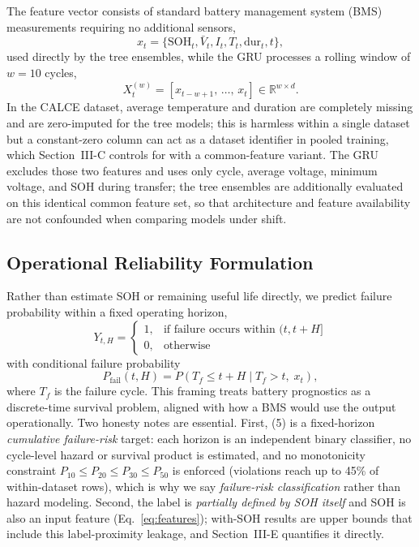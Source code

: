 \documentclass[conference]{IEEEtran}
\begin{document}
The feature vector consists of standard battery management system (BMS)
measurements requiring no additional sensors,
\begin{equation}
x_t = \{\mathrm{SOH}_t, \bar{V}_t, I_t, T_t, \mathrm{dur}_t, t\},
\label{eq:features}
\end{equation}
used directly by the tree ensembles, while the GRU processes a rolling
window of $w=10$ cycles,
\begin{equation}
X_t^{(w)} = \left[x_{t-w+1},\, \ldots,\, x_t\right] \in \mathbb{R}^{w \times d}.
\label{eq:window}
\end{equation} In the CALCE dataset, average temperature and
duration are completely missing and are zero-imputed for the tree
models; this is harmless within a single dataset but a constant-zero
column can act as a dataset identifier in pooled training, which
Section~III-C controls for with a common-feature variant. The GRU
excludes those two features and uses only cycle, average voltage,
minimum voltage, and SOH during transfer; the tree ensembles are
additionally evaluated on this identical common feature set, so that
architecture and feature availability are not confounded when
comparing models under shift.

\subsection{Operational Reliability Formulation}
Rather than estimate SOH or remaining useful life directly, we predict
failure probability within a fixed operating horizon,
\begin{equation}
Y_{t,H} =
\begin{cases}
1, & \text{if failure occurs within } (t, t+H]\\
0, & \text{otherwise}
\end{cases}
\label{eq:label}
\end{equation}
with conditional failure probability
\begin{equation}
P_{\mathrm{fail}}(t, H) = P\!\left(T_f \le t + H \mid T_f > t,\; x_t\right),
\label{eq:prob}
\end{equation}
where $T_f$ is the failure cycle. This framing treats battery
prognostics as a discrete-time survival problem, aligned with how a BMS
would use the output operationally. Two honesty notes are essential.
First, (5) is a fixed-horizon \emph{cumulative failure-risk} target:
each horizon is an independent binary classifier, no cycle-level hazard
or survival product is estimated, and no monotonicity constraint
$P_{10}\le P_{20}\le P_{30}\le P_{50}$ is enforced (violations reach
up to 45\% of within-dataset rows), which is why we say
\emph{failure-risk classification} rather than hazard modeling.
Second, the label is \emph{partially defined by SOH itself} and SOH is
also an input feature (Eq.~\ref{eq:features}); with-SOH results are
upper bounds that include this label-proximity leakage, and
Section~III-E quantifies it directly.
\end{document}
